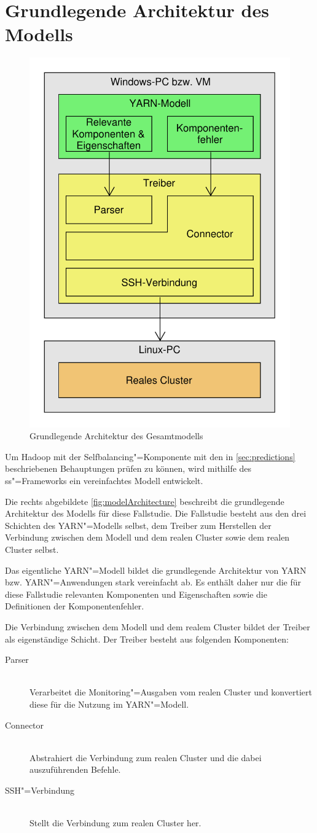 \section{Grundlegende Architektur des Modells}
\label{sec:aufbauModel}

\begin{figure}
    \includegraphics[width=0.5\columnwidth]
    {./images/modelArchitecture.pdf}
    \caption{Grundlegende Architektur des Gesamtmodells}
    \label{fig:modelArchitecture}
\end{figure}

Um Hadoop mit der Selfbalancing"=Komponente mit den in \autoref{sec:predictions} beschriebenen Behauptungen prüfen zu können, wird mithilfe des \ac{ss}"=Frameworks ein vereinfachtes Modell entwickelt.

Die rechts abgebildete \autoref{fig:modelArchitecture} beschreibt die grundlegende Architektur des Modells für diese Fallstudie.
Die Fallstudie besteht aus den drei Schichten des YARN"=Modells selbst, dem Treiber zum Herstellen der Verbindung zwischen dem Modell und dem realen Cluster sowie dem realen Cluster selbst.

Das eigentliche YARN"=Modell bildet die grundlegende Architektur von YARN bzw. YARN"=Anwendungen stark vereinfacht ab.
Es enthält daher nur die für diese Fallstudie relevanten Komponenten und Eigenschaften sowie die Definitionen der Komponentenfehler.

Die Verbindung zwischen dem Modell und dem realem Cluster bildet der Treiber als eigenständige Schicht.
Der Treiber besteht aus folgenden Komponenten:

\begin{description}
    \item [Parser] \hfill \\
        Verarbeitet die Monitoring"=Ausgaben vom realen Cluster und konvertiert diese für die Nutzung im YARN"=Modell.
    \item [Connector] \hfill \\
        Abstrahiert die Verbindung zum realen Cluster und die dabei auszuführenden Befehle.
    \item [SSH"=Verbindung]  \hfill \\
        Stellt die Verbindung zum realen Cluster her.
\end{description}

